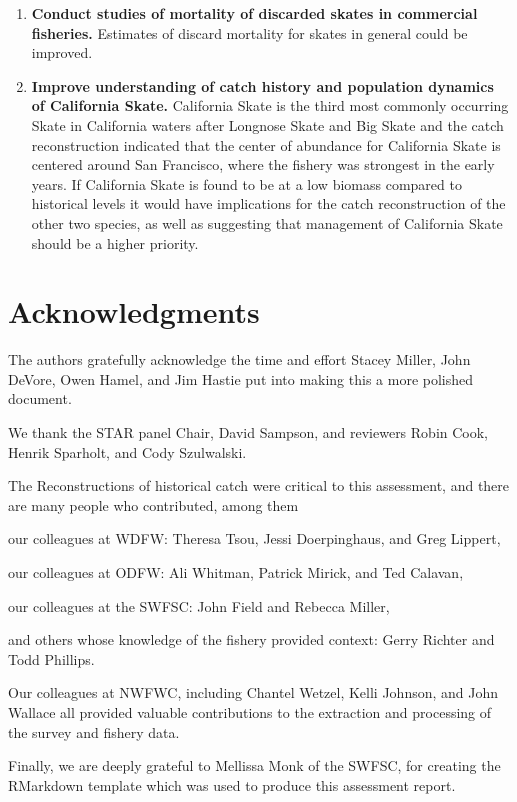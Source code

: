 \documentclass[12pt,]{article}
\begin{document}
\begin{enumerate}
\item \textbf{Conduct studies of mortality of discarded skates in commercial fisheries.} Estimates of discard mortality for skates in general could be improved.

\item \textbf{Improve understanding of catch history and population dynamics of California Skate.} California Skate is the third most commonly occurring Skate in California waters after Longnose Skate and Big Skate and the catch reconstruction indicated that the center of abundance for California Skate is centered around San Francisco, where the fishery was strongest in the early years. If California Skate is found to be at a low biomass compared to historical levels it would have implications for the catch reconstruction of the other two species, as well as suggesting that management of California Skate should be a higher priority.

\end{enumerate}

\hypertarget{acknowledgments}{%
\section{Acknowledgments}\label{acknowledgments}}

The authors gratefully acknowledge the time and effort Stacey Miller,
John DeVore, Owen Hamel, and Jim Hastie put into making this a more
polished document.

We thank the STAR panel Chair, David Sampson, and reviewers Robin Cook,
Henrik Sparholt, and Cody Szulwalski.

The Reconstructions of historical catch were critical to this
assessment, and there are many people who contributed, among them

our colleagues at WDFW: Theresa Tsou, Jessi Doerpinghaus, and Greg
Lippert,

our colleagues at ODFW: Ali Whitman, Patrick Mirick, and Ted Calavan,

our colleagues at the SWFSC: John Field and Rebecca Miller,

and others whose knowledge of the fishery provided context: Gerry
Richter and Todd Phillips.

Our colleagues at NWFWC, including Chantel Wetzel, Kelli Johnson, and
John Wallace all provided valuable contributions to the extraction and
processing of the survey and fishery data.

Finally, we are deeply grateful to Mellissa Monk of the SWFSC, for
creating the RMarkdown template which was used to produce this
assessment report.
\end{document}
